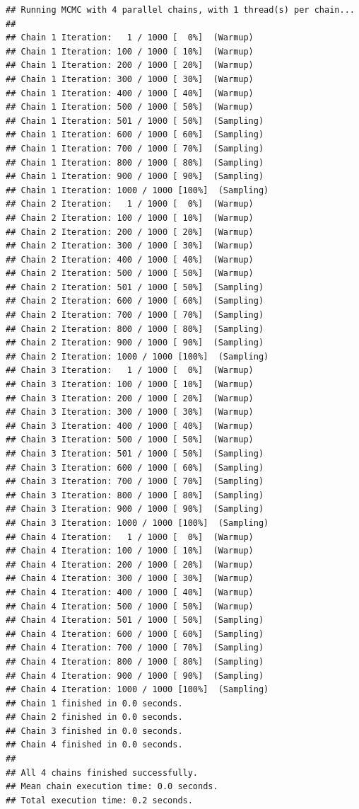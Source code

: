 \documentclass[
]{book}
\begin{document}
\begin{verbatim}
## Running MCMC with 4 parallel chains, with 1 thread(s) per chain...
## 
## Chain 1 Iteration:   1 / 1000 [  0%]  (Warmup) 
## Chain 1 Iteration: 100 / 1000 [ 10%]  (Warmup) 
## Chain 1 Iteration: 200 / 1000 [ 20%]  (Warmup) 
## Chain 1 Iteration: 300 / 1000 [ 30%]  (Warmup) 
## Chain 1 Iteration: 400 / 1000 [ 40%]  (Warmup) 
## Chain 1 Iteration: 500 / 1000 [ 50%]  (Warmup) 
## Chain 1 Iteration: 501 / 1000 [ 50%]  (Sampling) 
## Chain 1 Iteration: 600 / 1000 [ 60%]  (Sampling) 
## Chain 1 Iteration: 700 / 1000 [ 70%]  (Sampling) 
## Chain 1 Iteration: 800 / 1000 [ 80%]  (Sampling) 
## Chain 1 Iteration: 900 / 1000 [ 90%]  (Sampling) 
## Chain 1 Iteration: 1000 / 1000 [100%]  (Sampling) 
## Chain 2 Iteration:   1 / 1000 [  0%]  (Warmup) 
## Chain 2 Iteration: 100 / 1000 [ 10%]  (Warmup) 
## Chain 2 Iteration: 200 / 1000 [ 20%]  (Warmup) 
## Chain 2 Iteration: 300 / 1000 [ 30%]  (Warmup) 
## Chain 2 Iteration: 400 / 1000 [ 40%]  (Warmup) 
## Chain 2 Iteration: 500 / 1000 [ 50%]  (Warmup) 
## Chain 2 Iteration: 501 / 1000 [ 50%]  (Sampling) 
## Chain 2 Iteration: 600 / 1000 [ 60%]  (Sampling) 
## Chain 2 Iteration: 700 / 1000 [ 70%]  (Sampling) 
## Chain 2 Iteration: 800 / 1000 [ 80%]  (Sampling) 
## Chain 2 Iteration: 900 / 1000 [ 90%]  (Sampling) 
## Chain 2 Iteration: 1000 / 1000 [100%]  (Sampling) 
## Chain 3 Iteration:   1 / 1000 [  0%]  (Warmup) 
## Chain 3 Iteration: 100 / 1000 [ 10%]  (Warmup) 
## Chain 3 Iteration: 200 / 1000 [ 20%]  (Warmup) 
## Chain 3 Iteration: 300 / 1000 [ 30%]  (Warmup) 
## Chain 3 Iteration: 400 / 1000 [ 40%]  (Warmup) 
## Chain 3 Iteration: 500 / 1000 [ 50%]  (Warmup) 
## Chain 3 Iteration: 501 / 1000 [ 50%]  (Sampling) 
## Chain 3 Iteration: 600 / 1000 [ 60%]  (Sampling) 
## Chain 3 Iteration: 700 / 1000 [ 70%]  (Sampling) 
## Chain 3 Iteration: 800 / 1000 [ 80%]  (Sampling) 
## Chain 3 Iteration: 900 / 1000 [ 90%]  (Sampling) 
## Chain 3 Iteration: 1000 / 1000 [100%]  (Sampling) 
## Chain 4 Iteration:   1 / 1000 [  0%]  (Warmup) 
## Chain 4 Iteration: 100 / 1000 [ 10%]  (Warmup) 
## Chain 4 Iteration: 200 / 1000 [ 20%]  (Warmup) 
## Chain 4 Iteration: 300 / 1000 [ 30%]  (Warmup) 
## Chain 4 Iteration: 400 / 1000 [ 40%]  (Warmup) 
## Chain 4 Iteration: 500 / 1000 [ 50%]  (Warmup) 
## Chain 4 Iteration: 501 / 1000 [ 50%]  (Sampling) 
## Chain 4 Iteration: 600 / 1000 [ 60%]  (Sampling) 
## Chain 4 Iteration: 700 / 1000 [ 70%]  (Sampling) 
## Chain 4 Iteration: 800 / 1000 [ 80%]  (Sampling) 
## Chain 4 Iteration: 900 / 1000 [ 90%]  (Sampling) 
## Chain 4 Iteration: 1000 / 1000 [100%]  (Sampling) 
## Chain 1 finished in 0.0 seconds.
## Chain 2 finished in 0.0 seconds.
## Chain 3 finished in 0.0 seconds.
## Chain 4 finished in 0.0 seconds.
## 
## All 4 chains finished successfully.
## Mean chain execution time: 0.0 seconds.
## Total execution time: 0.2 seconds.
\end{verbatim}
\end{document}
